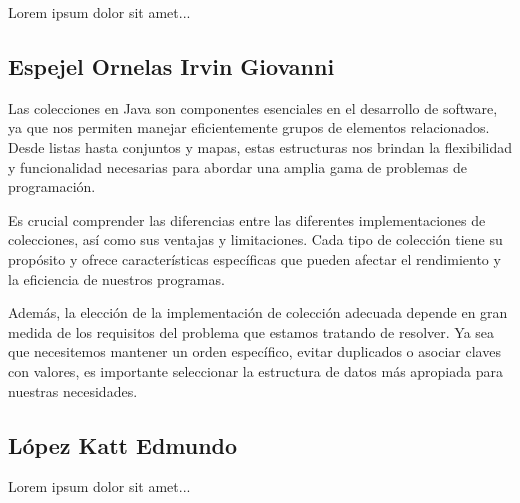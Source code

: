 \documentclass[a4paper,12pt]{article}
\begin{document}
Lorem ipsum dolor sit amet...

\subsection{Espejel Ornelas Irvin Giovanni}

Las colecciones en Java son componentes esenciales en el desarrollo de software, ya que nos permiten manejar eficientemente grupos de elementos relacionados. Desde listas hasta conjuntos y mapas, estas estructuras nos brindan la flexibilidad y funcionalidad necesarias para abordar una amplia gama de problemas de programación. 

Es crucial comprender las diferencias entre las diferentes implementaciones de colecciones, así como sus ventajas y limitaciones. Cada tipo de colección tiene su propósito y ofrece características específicas que pueden afectar el rendimiento y la eficiencia de nuestros programas. 

Además, la elección de la implementación de colección adecuada depende en gran medida de los requisitos del problema que estamos tratando de resolver. Ya sea que necesitemos mantener un orden específico, evitar duplicados o asociar claves con valores, es importante seleccionar la estructura de datos más apropiada para nuestras necesidades.

\subsection{López Katt Edmundo}

Lorem ipsum dolor sit amet...



\end{document}
